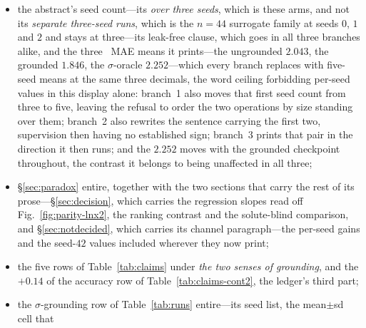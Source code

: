 \begin{itemize}[leftmargin=1.15em,labelsep=0.4em,topsep=3pt,itemsep=2pt,parsep=0pt,partopsep=0pt]
\item the abstract's
seed count---its \emph{over three seeds}, which is these arms, and not its \emph{separate
three-seed runs}, which is the $n{=}44$ surrogate family at seeds $0$, $1$ and $2$ and stays at
three---its leak-free clause, which goes in all three branches alike, and the three \lnx\ MAE
means it prints---the ungrounded $2.043$, the grounded $1.846$, the $\sigma$-oracle $2.252$---which
every branch replaces with five-seed means at the same three decimals, the word ceiling forbidding
per-seed values in this display alone: branch~1 also moves that first seed count from three to five,
leaving the refusal to order the two operations by size standing over them; branch~2 also rewrites
the sentence carrying the first two, supervision then having no established sign; branch~3 prints
that pair in the direction it then runs; and the $2.252$ moves with the grounded checkpoint
throughout, the contrast it belongs to being unaffected in all three;
\item \S\ref{sec:paradox} entire, together with the two sections that carry the rest of
its prose---\S\ref{sec:decision}, which carries the regression slopes read off
Fig.~\ref{fig:parity-lnx2}, the ranking contrast and the solute-blind comparison, and
\S\ref{sec:notdecided}, which carries its channel paragraph---the per-seed gains and the seed-$42$
values included wherever they now print;
\item the five rows of
Table~\ref{tab:claims} under \emph{the two senses of grounding}, and the $+0.14$ of the accuracy row
of Table~\ref{tab:claims-cont2}, the ledger's third part;
\item the $\sigma$-grounding row of Table~\ref{tab:runs} entire---its seed list, the mean$\pm$sd cell that

\end{itemize}
